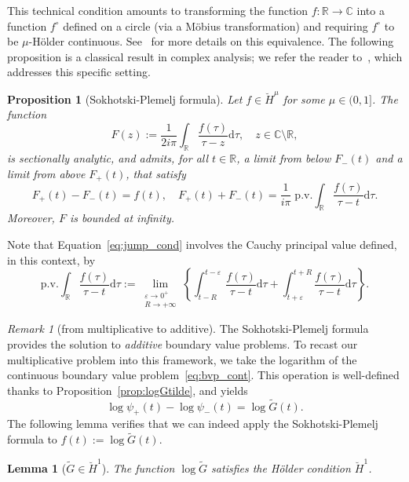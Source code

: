\documentclass{article}
\theoremstyle{plain}
\newtheorem{proposition}[theorem]{Proposition}
\newtheorem{lemma}[theorem]{Lemma}
\theoremstyle{definition}
\theoremstyle{remark}
\newtheorem{remark}[theorem]{Remark}
\begin{document}
This technical condition amounts to transforming the function $f:\mathbb R\to\mathbb C$ into a function $f^\circ$ defined on a circle (via a Möbius transformation) and requiring $f^\circ$ to be $\mu$-Hölder continuous. See~\cite[Lemma 5.1.2]{lu94} for more details on this equivalence. The following proposition is a classical result in complex analysis; we refer the reader to~\cite[\S 14.7]{gakhov}, which addresses this specific setting.

\begin{proposition}[Sokhotski-Plemelj formula]\label{prop:SP} Let $f\in \breve{H}^\mu$ for some $\mu\in (0,1]$. The function
$$F(z):=\frac{1}{2i\pi}\int_{\mathbb R}\frac{ f(\tau)}{\tau-z}\mathrm{d}\tau,\quad z\in\mathbb C\setminus \mathbb R,$$
is sectionally analytic, and admits, for all $t\in\mathbb R$, a limit from below $F_-(t)$ and a limit from above $F_+(t)$, that satisfy
\begin{equation}\label{eq:jump_cond}
    F_+(t)-F_-(t)=f(t),\quad F_+(t)+F_-(t)=\frac{1}{i\pi }\;\mathrm{p.v.}\int_{\mathbb R}\frac{f(\tau)}{\tau-t}\mathrm{d}\tau.
\end{equation}
Moreover, $F$ is bounded at infinity.
\end{proposition}
Note that Equation~\eqref{eq:jump_cond} involves the Cauchy principal value defined, in this context, by
$$\mathrm{p.v.}\int_{\mathbb R}\frac{f(\tau)}{\tau-t}\mathrm{d}\tau :=\lim_{\substack{\varepsilon\to 0^+ \\[0.08cm] R\to+\infty}}\left\{\int_{t-R}^{t-\varepsilon}\frac{f(\tau)}{\tau-t}\mathrm{d}\tau+\int_{t+\varepsilon}^{t+R}\frac{f(\tau)}{\tau-t}\mathrm{d}\tau\right\}.$$

\begin{remark}[from multiplicative to additive]
The Sokhotski-Plemelj formula provides the solution to \textit{additive} boundary value problems. To recast our multiplicative problem into this framework, we take the logarithm of the continuous boundary value problem~\eqref{eq:bvp_cont}. This operation is well-defined thanks to Proposition~\ref{prop:logGtilde}, and yields
\begin{equation}\label{eq:additive_bvp}
    \log\psi_+(t)-\log\psi_-(t)=\log\widetilde{G}(t).
\end{equation}
The following lemma verifies that we can indeed apply the Sokhotski-Plemelj formula to $f(t):=\log\widetilde{G}(t)$.
\end{remark}

\begin{lemma}[$\widetilde{G}\in\breve{H}^1$]\label{lemma:holder} The function $\log\widetilde{G}$ satisfies the Hölder condition $\breve{H}^1$.
\end{lemma}
\end{document}
